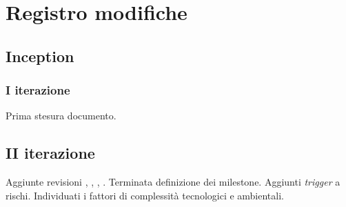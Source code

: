 \documentclass[10pt]{softeng}
\begin{document}
\startofdocument

\clearpage







\clearpage



\clearpage



\clearpage

\section{Registro modifiche}

\subsection{Inception}

\subsubsection{I iterazione}

Prima stesura documento.

\subsection{II iterazione}

Aggiunte revisioni , , , .
Terminata definizione dei milestone.
Aggiunti \emph{trigger} a rischi.
Individuati i fattori di complessit\`a tecnologici e ambientali.
\end{document}
